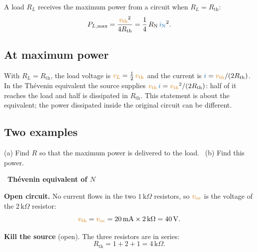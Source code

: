 \documentclass[11pt,a4paper]{article}
\newcommand{\Icol}[1]{\textcolor{ccur}{#1}}
\newcommand{\Vcol}[1]{\textcolor{cvolt}{#1}}
\newif\ifsolfirst
\newcommand{\solution}{\par\smallskip\noindent{\color{cpow}\bfseries Solution}\par\nobreak\smallskip\global\solfirsttrue}
\newcommand{\solstep}[2]{\par\ifsolfirst\global\solfirstfalse\else\medskip\needspace{5\baselineskip}\fi
  \noindent{\color{cpow}\bfseries Step #1.}\ {\bfseries #2}\par\nobreak\smallskip}
\newcommand{\lR}[3]{\node[anchor=west, xshift=7pt, font=\small] at (#1,#2) {#3};}
\newcommand{\lL}[3]{\node[anchor=east, xshift=-7pt, font=\small] at (#1,#2) {#3};}
\newcommand{\Rth}{R_{\mathrm{th}}}
\newcommand{\RN}{R_{\mathrm{N}}}
\newcommand{\vth}{\Vcol{v_{\mathrm{th}}}}
\newcommand{\iN}{\Icol{i_{\mathrm{N}}}}
\newcommand{\voc}{\Vcol{v_{\mathrm{oc}}}}
\newcommand{\kohm}{\,\mathrm{k}\Omega}
\newcommand{\mA}{\,\mathrm{mA}}
\newcommand{\exM}[1]{%
  \ifnum#1=2
    \draw (0,2.2) -- (0,1.65); \draw (0,0) -- (0,0.55);
    \draw (0,1.65) node[ocirc] {}; \draw (0,0.55) node[ocirc] {};
    \node[font=\small, text=metured, anchor=east] at (-0.15,1.1) {open};
  \else
    \draw (0,0) to[american current source] (0,2.2); \lL{0}{1.1}{$\Icol{20\mA}$}
  \fi
  \draw (0,2.2) -- (1.4,2.2); \draw (0,0) -- (1.4,0);
  \draw (1.4,2.2) to[R] (1.4,0); \lR{1.4}{1.1}{$2\kohm$}
  \draw (1.4,2.2) to[R, l=$1\kohm$] (3.4,2.2) -- (3.8,2.2);
  \draw (1.4,0) to[R, l_=$1\kohm$] (3.4,0) -- (3.8,0);
  \fill (1.4,2.2) circle (1.7pt); \fill (1.4,0) circle (1.7pt);
  \ifcase#1
    \draw (3.8,2.2) -- (6.6,2.2); \draw (3.8,0) -- (6.6,0);
    \draw (5.2,2.2) to[R] (5.2,0); \lR{5.2}{1.1}{$R$}
    \draw (6.6,2.2) to[R] (6.6,0); \lR{6.6}{1.1}{$6\kohm$}
    \fill (5.2,2.2) circle (1.7pt); \fill (5.2,0) circle (1.7pt);
    \draw (3.8,2.2) node[ocirc] {} node[above, tlab] {a};
    \draw (3.8,0) node[ocirc] {} node[below, tlab] {b};
    \draw[dashed, metugray] (-2.1,-1.0) rectangle (3.55,3.2); \node[font=\small, text=metugray] at (0.7,-1.3) {$N$};
    \draw[dashed, metugray] (4.3,-1.0) rectangle (8.3,3.2); \node[font=\small, text=metugray] at (6.3,-1.3) {the load};
  \or
    \draw (3.8,2.2) node[ocirc] {} node[above, tlab] {a};
    \draw (3.8,0) node[ocirc] {} node[below, tlab] {b};
    \node[pol] at (4.25,1.6) {$+$}; \node[pol] at (4.25,0.6) {$-$};
    \node[font=\small, text=cvolt] at (4.3,1.1) {$v_{\mathrm{oc}}$};
  \or
    \draw (3.8,2.2) node[ocirc] {} node[above, tlab] {a};
    \draw (3.8,0) node[ocirc] {} node[below, tlab] {b};
    \draw[bigarr] (5.0,1.1) -- (4.1,1.1); \node[right] at (5.0,1.1) {$\Rth$};
  \fi}
\begin{document}
\begin{ideabox}
A load $R_L$ receives the maximum power from a circuit when $R_L = \Rth$:
\[
  P_{L,\max} = \frac{\vth^2}{4\Rth} = \frac14\,\RN\,\iN^2 .
\]
\end{ideabox}

\subsection{At maximum power}

With $R_L = \Rth$, the load voltage is $\Vcol{v_L} = \frac12\,\vth$ and the current is
$\Icol{i} = \vth/(2\Rth)$. In the Th\'evenin equivalent the source supplies
$\vth\,\Icol{i} = \vth^2/(2\Rth)$: half of it reaches the load and half is dissipated in $\Rth$.
This statement is about the equivalent; the power dissipated inside the original circuit can be
different.

\subsection{Two examples}

\bigskip
\begin{examplebox}
\begin{center}
\end{center}
(a) Find $R$ so that the maximum power is delivered to the load. \ (b) Find this power.
\end{examplebox}

\solution

\solstep{1}{Th\'evenin equivalent of $N$}
\begin{minipage}[t]{0.48\linewidth}
\centering
{}

\raggedright
\textbf{Open circuit.} No current flows in the two $1\kohm$ resistors, so $\voc$ is the voltage
of the $2\kohm$ resistor:
\[
  \vth = \voc = 20\mA \times 2\kohm = 40\V .
\]
\end{minipage}\hfill
\begin{minipage}[t]{0.48\linewidth}
\centering
{}

\raggedright
\textbf{Kill the source} (open). The three resistors are in series:
\[
  \Rth = 1 + 2 + 1 = 4\kohm .
\]
\end{minipage}
\end{document}
